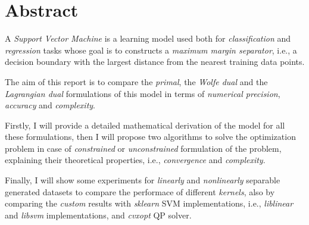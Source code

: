 \section{Abstract}

A \emph{Support Vector Machine} is a learning model used both for \emph{classification} and \emph{regression} tasks whose goal is to constructs a \emph{maximum margin separator}, i.e., a decision boundary with the largest distance from the nearest training data points.

The aim of this report is to compare the \emph{primal}, the \emph{Wolfe dual} \cite{fletcher2009support} and the \emph{Lagrangian dual} formulations of this model in terms of \emph{numerical precision}, \emph{accuracy} and \emph{complexity}.

Firstly, I will provide a detailed mathematical derivation of the model for all these formulations, then I will propose two algorithms to solve the optimization problem in case of \emph{constrained} or \emph{unconstrained} formulation of the problem, explaining their theoretical properties, i.e., \emph{convergence} and \emph{complexity}.

Finally, I will show some experiments for \emph{linearly} and \emph{nonlinearly} separable generated datasets to compare the performace of different \emph{kernels}, also by comparing the \emph{custom} results with \emph{sklearn} SVM implementations, i.e., \emph{liblinear} \cite{fan2008liblinear} and \emph{libsvm} \cite{chang2011libsvm} implementations, and \emph{cvxopt} \cite{vandenberghe2010cvxopt} QP solver.
